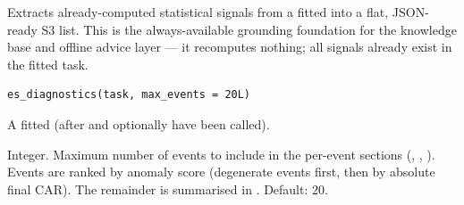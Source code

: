 \documentclass[a4paper]{book}
\begin{document}
%
\begin{Description}
Extracts already-computed statistical signals from a fitted
 into a flat, JSON-ready S3 list. This is the
always-available grounding foundation for the knowledge base and offline
advice layer — it recomputes nothing; all signals already exist in the
fitted task.
\end{Description}
%
\begin{Usage}
\begin{verbatim}
es_diagnostics(task, max_events = 20L)
\end{verbatim}
\end{Usage}
%
\begin{Arguments}
\begin{ldescription}
\item[\code{task}] A fitted  (after  and
optionally  have been called).

\item[\code{max\_events}] Integer. Maximum number of events to include in the
per-event sections (, ,
). Events are ranked by anomaly score (degenerate
events first, then by absolute final CAR). The remainder is summarised
in . Default: 20.
\end{ldescription}
\end{Arguments}
%
\end{document}
